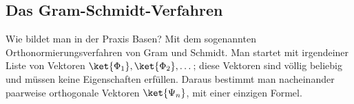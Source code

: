 \subsection{Das Gram-Schmidt-Verfahren}\label{c03.s7.1}

Wie bildet man in der Praxis Basen? Mit dem sogenannten Orthonormierungsverfahren von Gram und
Schmidt. Man startet mit irgendeiner Liste von Vektoren $\ket{\Phi_1}, \ket{\Phi_2}, \dots$;
diese Vektoren sind völlig beliebig und müssen keine Eigenschaften erfüllen. Daraus bestimmt
man nacheinander paarweise orthogonale Vektoren $\ket{\Psi_n}$, mit einer einzigen Formel.

